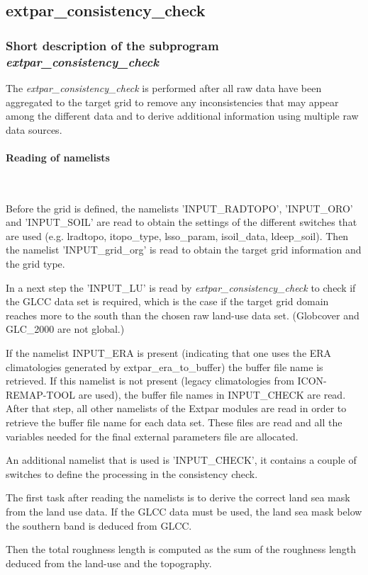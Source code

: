 \documentclass[a4paper,10pt,DIV14,BCOR1cm,titlepage,twoside]{scrartcl}
\begin{document}
\subsection{extpar\_consistency\_check}\label{extpar_consistency_check}
\subsubsection{Short description of the subprogram \textit{extpar\_consistency\_check}}
The \textit{extpar\_consistency\_check} is performed after all raw data have been aggregated to the target grid to remove any inconsistencies that may appear among the different data and to derive additional information using multiple raw data sources.\par\medskip\noindent
\paragraph{Reading of namelists}\ \par\medskip\noindent
Before the grid is defined, the namelists 'INPUT\_RADTOPO', 'INPUT\_ORO' and 'INPUT\_SOIL' are read to obtain the settings of the different switches that are used (e.g. lradtopo, itopo\_type, lsso\_param, isoil\_data, ldeep\_soil). Then the namelist 'INPUT\_grid\_org' is read to obtain the target grid information and the grid type.\par\medskip\noindent
In a next step the 'INPUT\_LU' is read by \textit{extpar\_consistency\_check} to check if the GLCC data set is required, which is the case if the target grid domain reaches more to the south than the chosen raw land-use data set. (Globcover and GLC\_2000 are not global.)\par\medskip\noindent
If the namelist INPUT\_ERA is present (indicating that one uses the ERA climatologies generated by extpar\_era\_to\_buffer) the buffer file name is retrieved. If this namelist is not present (legacy climatologies from ICON-REMAP-TOOL are used), the buffer file names in INPUT\_CHECK are read.
After that step, all other namelists of the Extpar modules are read in order to retrieve the buffer file name for each data set. These files are read and all the variables needed for the final external parameters file are allocated. \par\medskip\noindent\par\medskip\noindent
An additional namelist that is used is 'INPUT\_CHECK', it contains a couple of switches to define the processing in the consistency check. \par\medskip\noindent
The first task after reading the namelists is to derive the correct land sea mask from the land use data. If the GLCC data must be used, the land sea mask below the southern band is deduced from GLCC.\par\medskip\noindent
Then the total roughness length is computed as the sum of the roughness length deduced from the land-use and the topography.\par\medskip\noindent
\end{document}
